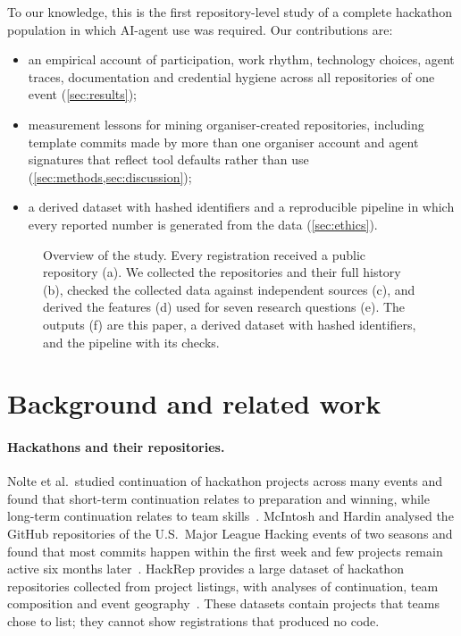 \documentclass{article}
\begin{document}
\noindent To our knowledge, this is the first repository-level study of a complete hackathon population in which AI-agent use was required. Our contributions are:
\begin{itemize}
  \item an empirical account of participation, work rhythm, technology choices, agent traces, documentation and credential hygiene across all \NReposTotal{} repositories of one event (\cref{sec:results});
  \item measurement lessons for mining organiser-created repositories, including template commits made by more than one organiser account and agent signatures that reflect tool defaults rather than use (\cref{sec:methods,sec:discussion});
  \item a derived dataset with hashed identifiers and a reproducible pipeline in which every reported number is generated from the data (\cref{sec:ethics}).
\end{itemize}

\begin{figure}[t]
  \centering
  
  \caption{Overview of the study. Every registration received a public repository (a). We collected the repositories and their full history (b), checked the collected data against independent sources (c), and derived the features (d) used for seven research questions (e). The outputs (f) are this paper, a derived dataset with hashed identifiers, and the pipeline with its checks.}
  \label{fig:overview}
\end{figure}

\section{Background and related work}\label{sec:related}

\paragraph{Hackathons and their repositories.}
Nolte et al.\ studied continuation of hackathon projects across many events and found that short-term continuation relates to preparation and winning, while long-term continuation relates to team skills~\cite{nolte2020hackathon}. McIntosh and Hardin analysed the GitHub repositories of the U.S.\ Major League Hacking events of two seasons and found that most commits happen within the first week and few projects remain active six months later~\cite{mcintosh2021hackathon}. HackRep provides a large dataset of hackathon repositories collected from project listings, with analyses of continuation, team composition and event geography~\cite{halmans2026hackrep}. These datasets contain projects that teams chose to list; they cannot show registrations that produced no code.
\end{document}
